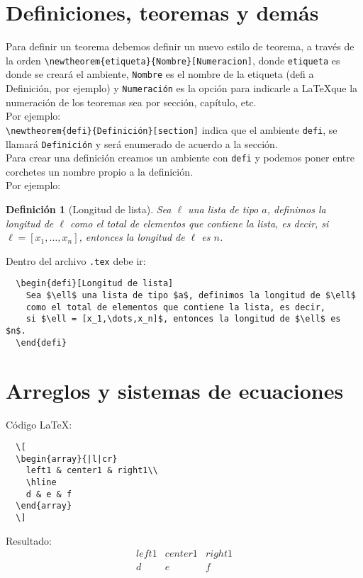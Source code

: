 \documentclass[spanish,12pt,letterpaper]{article}
\theoremstyle{break}
\newtheorem{defi}{Definición}
\begin{document}
\section{Definiciones, teoremas y demás}
Para definir un teorema debemos definir un nuevo estilo de teorema, a través de la orden \verb!\newtheorem{etiqueta}{Nombre}[Numeracion]!,
donde \texttt{etiqueta} es donde se creará el ambiente, \texttt{Nombre} es el nombre de la etiqueta (defi a Definición, por ejemplo) y \texttt{Numeración}
es la opción para indicarle a \LaTeX que la numeración de los teoremas sea por sección, capítulo, etc.\\
Por ejemplo:\\
\verb!\newtheorem{defi}{Definición}[section]! indica que el ambiente \texttt{defi}, se llamará \texttt{Definición} y será enumerado de acuerdo a la sección.\\
Para crear una definición creamos un ambiente con \texttt{defi} y podemos poner entre corchetes un nombre propio a la definición.\\
Por ejemplo:\\
\begin{defi}[Longitud de lista]
  Sea $\ell$ una lista de tipo $a$, definimos la longitud de $\ell$ como el total de elementos que contiene la lista, es decir,
  si $\ell = [x_1,\dots,x_n]$, entonces la longitud de $\ell$ es $n$.
\end{defi}
Dentro del archivo \texttt{.tex} debe ir:
\begin{verbatim}
  \begin{defi}[Longitud de lista]
    Sea $\ell$ una lista de tipo $a$, definimos la longitud de $\ell$ 
    como el total de elementos que contiene la lista, es decir,
    si $\ell = [x_1,\dots,x_n]$, entonces la longitud de $\ell$ es $n$.
  \end{defi}
\end{verbatim}

\section{Arreglos y sistemas de ecuaciones}
Código \LaTeX:\\
\begin{verbatim}
  \[
  \begin{array}{|l|cr}
    left1 & center1 & right1\\
    \hline
    d & e & f
  \end{array}
  \]
\end{verbatim}
Resultado:\\
\[
\begin{array}{|l|cr}
  left1 & center1 & right1\\
  \hline
  d & e & f
\end{array}
\]
\end{document}
